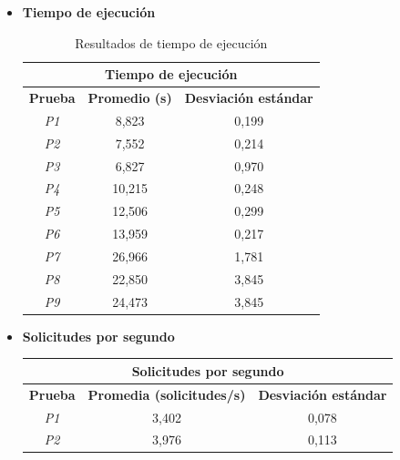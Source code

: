 \begin{itemize}
	\item \textbf{Tiempo de ejecución}
		\begin{table}[!ht]
			\begin{center}
				\begin{tabular}{|c|c|c|}
					\hline
					\multicolumn{3}{|c|}{{\bf Tiempo de ejecución}}               \\ \hline
					{\bf Prueba} & {\bf Promedio (s)} & {\bf Desviación estándar} \\ \hline
					{\it P1}     & 8,823              & 0,199                     \\ \hline
					{\it P2}     & 7,552              & 0,214                     \\ \hline
					{\it P3}     & 6,827              & 0,970                     \\ \hline
					{\it P4}     & 10,215             & 0,248                     \\ \hline
					{\it P5}     & 12,506             & 0,299                     \\ \hline
					{\it P6}     & 13,959             & 0,217                     \\ \hline
					{\it P7}     & 26,966             & 1,781                     \\ \hline
					{\it P8}     & 22,850             & 3,845                     \\ \hline
					{\it P9}     & 24,473             & 3,845                     \\ \hline
				\end{tabular}
				\caption{Resultados de tiempo de ejecución}
				\label{table:rte}
			\end{center}
		\end{table}
	\item \textbf{Solicitudes por segundo}
		\begin{table}[!ht]
			\begin{center}
				\begin{tabular}{|c|c|c|}
					\hline
					\multicolumn{3}{|c|}{{\bf Solicitudes por segundo}}                       \\ \hline
					{\bf Prueba} & {\bf Promedia (solicitudes/s)} & {\bf Desviación estándar} \\ \hline
					{\it P1}     & 3,402                          & 0,078                     \\ \hline
					{\it P2}     & 3,976                          & 0,113                     \\ \hline

\end{tabular}
\end{center}
\end{table}
\end{itemize}
